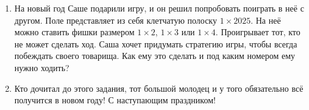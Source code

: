 \documentclass[a4paper,12pt]{article}
\begin{document}
\begin{enumerate}
        \item На новый год Саше подарили игру, и он решил попробовать  поиграть в неё с другом. Поле представляет из себя клетчатую полоску $1 \times 2025$. На неё можно ставить фишки размером $1 \times 2$, $1 \times 3$ или $1 \times 4$. Проигрывает тот, кто не может сделать ход. Саша хочет придумать стратегию игры, чтобы всегда побеждать своего товарища. Как ему это сделать и под каким номером ему нужно ходить?
        \item Кто дочитал до этого задания, тот большой молодец и у того обязательно всё получится в новом году! С наступающим праздником!
    
    \end{enumerate}
\end{document}

